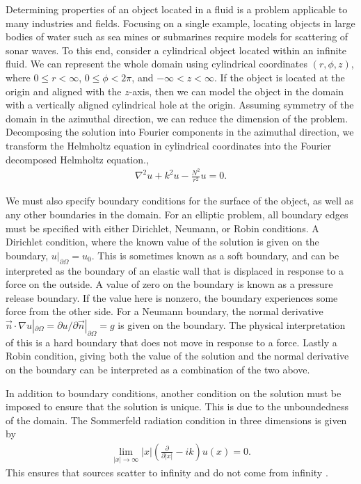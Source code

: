 Determining properties of an object located in a fluid is a problem applicable to many industries and fields.
Focusing on a single example, locating objects in large bodies of water such as sea mines or submarines require models for scattering of sonar waves.
To this end, consider a cylindrical object located within an infinite fluid.
We can represent the whole domain using cylindrical coordinates $(r, \phi, z)$, where $0\leq r < \infty$, $0 \leq \phi < 2\pi$, and $-\infty < z < \infty$.
If the object is located at the origin and aligned with the $z$-axis, then we can model the object in the domain with a vertically aligned cylindrical hole at the origin.
Assuming symmetry of the domain in the azimuthal direction, we can reduce the dimension of the problem.
Decomposing the solution into Fourier components in the azimuthal direction, we transform the Helmholtz equation in cylindrical coordinates into the Fourier decomposed Helmholtz equation.,
\begin{align}
	\nabla^2 u + k^2 u - \frac{N^2}{r^2}u = 0.
\end{align}


We must also specify boundary conditions for the surface of the object, as well as any other boundaries in the domain.
For an elliptic problem, all boundary edges must be specified with either Dirichlet, Neumann, or Robin conditions.
A Dirichlet condition, where the known value of the solution is given on the boundary, $u|_{\partial\Omega}=u_0$.
This is sometimes known as a soft boundary, and can be interpreted as the boundary of an elastic wall that is displaced in response to a force on the outside.
A value of zero on the boundary is known as a pressure release boundary.
If the value here is nonzero, the boundary experiences some force from the other side.
For a Neumann boundary, the normal derivative $\vec{n}\cdot \nabla u |_{\partial \Omega} = \partial u / \partial \vec{n} |_{\partial \Omega}=g$ is given on the boundary.
The physical interpretation of this is a hard boundary that does not move in response to a force.
Lastly a Robin condition, giving both the value of the solution and the normal derivative on the boundary can be interpreted as a combination of the two above.



In addition to boundary conditions, another condition on the solution must be imposed to ensure that the solution is unique.
This is due to the unboundedness of the domain.
The Sommerfeld radiation condition in three dimensions is given by
\begin{align}
	\lim_{|x|\rightarrow \infty} |x| \left( \frac{\partial}{\partial |x|} - ik \right) u(x) = 0. \label{eqn:sommerfeld}
\end{align}
This ensures that sources scatter to infinity and do not come from infinity \cite{sommerfeld}.

